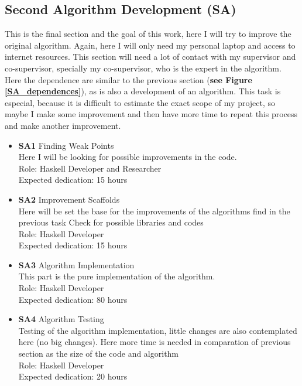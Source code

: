 \subsection{Second Algorithm Development \textbf{(SA)}}
This is the final section and the goal of this work, here I will try to improve the original algorithm.
Again, here I will only need my personal laptop and access to internet resources.
This section will need a lot of contact with my supervisor and co-supervisor, specially my co-supervisor, who is the expert in the algorithm.
Here the dependence are similar to the previous section (\textbf{see Figure \ref{SA_dependences}}), as is also a development of an algorithm.
This task is especial, because it is difficult to estimate the exact scope of my project, so maybe I make some improvement and then have more time to repeat this process and make another improvement.
\begin{itemize}
    \item \textbf{SA1} Finding Weak Points \\
        Here I will be looking for possible improvements in the code.\\
        Role: Haskell Developer and Researcher\\
        Expected dedication: 15 hours
        \item \textbf{SA2} Improvement Scaffolds \\
        Here will be set the base for the improvements of the algorithms find in the previous task
        Check for possible libraries and codes \\
        Role: Haskell Developer \\
        Expected dedication: 15 hours
    \item \textbf{SA3} Algorithm Implementation\\
        This part is the pure implementation of the algorithm. \\
        Role: Haskell Developer \\
        Expected dedication: 80 hours
    \item \textbf{SA4} Algorithm Testing \\
        Testing of the algorithm implementation, little changes are also contemplated here (no big changes).
        Here more time is needed in comparation of previous section as the size of the code and algorithm\\
        Role: Haskell Developer \\
        Expected dedication: 20 hours
\end{itemize}
